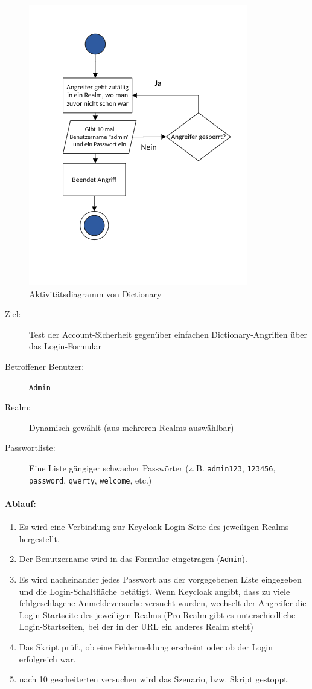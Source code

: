 \documentclass[a4paper,12pt]{article}
\begin{document}
	\begin{figure}
		\centering
		\includegraphics[width=0.4\linewidth]{Bilder/angriff_3}
		\caption{Aktivitätsdiagramm von Dictionary}
		\label{fig:angriff3}
	\end{figure}
		
	\begin{description}
		\item[Ziel:] Test der Account-Sicherheit gegenüber einfachen Dictionary-Angriffen über das Login-Formular
		\item[Betroffener Benutzer:] \texttt{Admin}
		\item[Realm:] Dynamisch gewählt (aus mehreren Realms auswählbar)
		\item[Passwortliste:] Eine Liste gängiger schwacher Passwörter (z.\,B. \texttt{admin123}, \texttt{123456}, \texttt{password}, \texttt{qwerty}, \texttt{welcome}, etc.)
	\end{description}
	
	\paragraph{Ablauf:}
	\begin{enumerate}
		\item Es wird eine Verbindung zur Keycloak-Login-Seite des jeweiligen Realms hergestellt.
		\item Der Benutzername wird in das Formular eingetragen (\texttt{Admin}).
		\item Es wird nacheinander jedes Passwort aus der vorgegebenen Liste eingegeben und die Login-Schaltfläche betätigt. Wenn Keycloak angibt, dass zu viele fehlgeschlagene Anmeldeversuche versucht wurden, wechselt der Angreifer die Login-Startseite des jeweiligen Realms (Pro Realm gibt es unterschiedliche Login-Startseiten, bei der in der URL ein anderes Realm steht)
		\item Das Skript prüft, ob eine Fehlermeldung erscheint oder ob der Login erfolgreich war.
		\item nach 10 gescheiterten versuchen wird das Szenario, bzw. Skript gestoppt.
	\end{enumerate}
	
\end{document}
